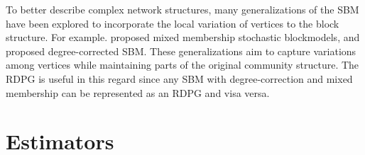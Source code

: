 \documentclass[journal,twoside,web]{ieeecolor}
\begin{document}
To better describe complex network structures, many
generalizations of the SBM have been explored to incorporate the local variation of vertices to the block structure. 
For example. \cite{airoldi2008mixed} proposed mixed membership stochastic blockmodels, 
and \cite{karrer2011stochastic} proposed degree-corrected SBM.
These generalizations aim to capture variations among vertices while maintaining parts of the original community structure.
The RDPG is useful in this regard since any SBM with degree-correction and mixed membership can be represented as an RDPG and visa versa.


\section{Estimators}
\label{sec:estimator}



\end{document}
